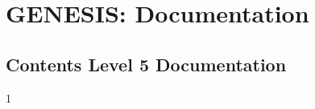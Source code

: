 \documentclass[12pt]{article}
\begin{document}
\section*{GENESIS: Documentation}

\subsection*{Contents Level 5 Documentation}

\begin{itemize}

1
\end{itemize}

\end{document}
